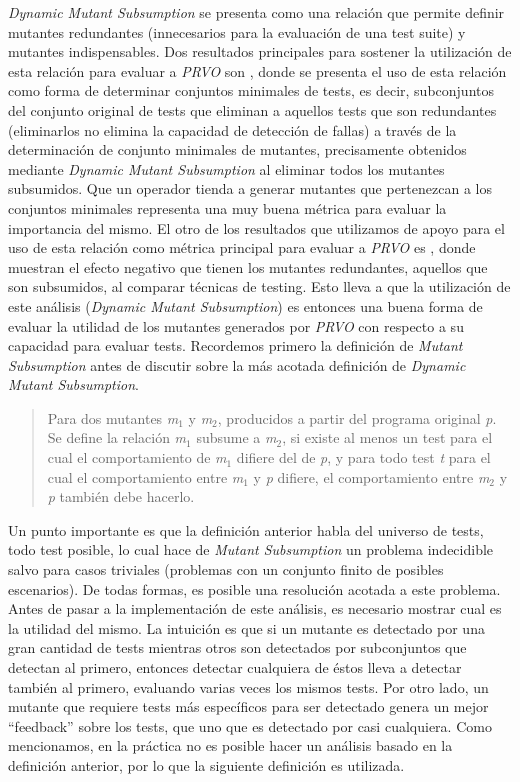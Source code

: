 \emph{Dynamic Mutant Subsumption} se presenta como una relaci\'on que permite definir mutantes redundantes (innecesarios para la evaluaci\'on de una test suite) y mutantes indispensables. Dos resultados principales para sostener la utilizaci\'on de esta relaci\'on para evaluar a \emph{PRVO} son \cite{bibliography.mutation.minimizing.dynamicsubsumption}, donde se presenta el uso de esta relaci\'on como forma de determinar conjuntos minimales de tests, es decir, subconjuntos del conjunto original de tests que eliminan a aquellos tests que son redundantes (eliminarlos no elimina la capacidad de detecci\'on de fallas) a través de la determinaci\'on de conjunto minimales de mutantes, precisamente obtenidos mediante \emph{Dynamic Mutant Subsumption} al eliminar todos los mutantes subsumidos. Que un operador tienda a generar mutantes que pertenezcan a los conjuntos minimales representa una muy buena m\'etrica para evaluar la importancia del mismo. El otro de los resultados que utilizamos de apoyo para el uso de esta relaci\'on como m\'etrica principal para evaluar a \emph{PRVO} es \cite{bibliography.mutation.evaluation.PapadakisHHJT16}, donde muestran el efecto negativo que tienen los mutantes redundantes, aquellos que son subsumidos, al comparar t\'ecnicas de testing. Esto lleva a que la utilizaci\'on de este an\'alisis (\emph{Dynamic Mutant Subsumption}) es entonces una buena forma de evaluar la utilidad de los mutantes generados por \emph{PRVO} con respecto a su capacidad para evaluar tests.
Recordemos primero la definici\'on de \emph{Mutant Subsumption} antes de discutir sobre la m\'as acotada definici\'on de \emph{Dynamic Mutant Subsumption}.
\begin{quote}
	Para dos mutantes \emph{m$_1$} y \emph{m$_2$}, producidos a partir del programa original \emph{p}. Se define la relaci\'on \emph{m$_1$} subsume a \emph{m$_2$}, si existe al menos un test para el cual el comportamiento de \emph{m$_1$} difiere del de \emph{p}, y para todo test \emph{t} para el cual el comportamiento entre \emph{m$_1$} y \emph{p} difiere, el comportamiento entre \emph{m$_2$} y \emph{p} tambi\'en debe hacerlo.
\end{quote}
Un punto importante es que la definici\'on anterior habla del universo de tests, todo test posible, lo cual hace de \emph{Mutant Subsumption} un problema indecidible salvo para casos triviales (problemas con un conjunto finito de posibles escenarios). De todas formas, es posible una resoluci\'on acotada a este problema. Antes de pasar a la implementaci\'on de este an\'alisis, es necesario mostrar cual es la utilidad del mismo. La intuici\'on es que si un mutante es detectado por una gran cantidad de tests mientras otros son detectados por subconjuntos que detectan al primero, entonces detectar cualquiera de \'estos lleva a detectar tambi\'en al primero, evaluando varias veces los mismos tests. Por otro lado, un mutante que requiere tests m\'as espec\'ificos para ser detectado genera un mejor ``feedback'' sobre los tests, que uno que es detectado por casi cualquiera. Como mencionamos, en la pr\'actica no es posible hacer un an\'alisis basado en la definici\'on anterior, por lo que la siguiente definici\'on es utilizada.
